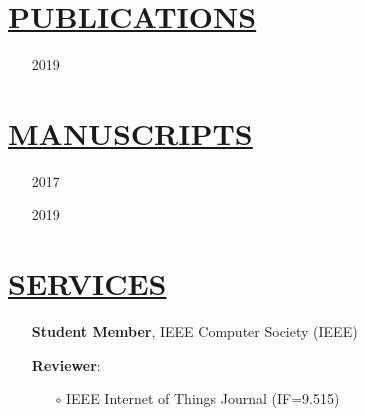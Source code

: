 \documentclass[11pt]{article}
\begin{document}
\section*{\centering\underline{PUBLICATIONS}}
\begin{itemize}
    \item[2019] 
\end{itemize}
\section*{\centering\underline{MANUSCRIPTS}}
\begin{itemize}
    \item[2017] 
    \item[2019] 
\end{itemize}

\section*{\centering\underline{SERVICES}}
\begin{itemize}
    \item[] \textbf{Student Member}, IEEE Computer Society (IEEE)
    \item[] \textbf{Reviewer}:
        \begin{itemize}[noitemsep, nolistsep]
            \item[$\circ$] IEEE Internet of Things Journal (IF=9.515)
        \end{itemize}
\end{itemize}
\end{document}
